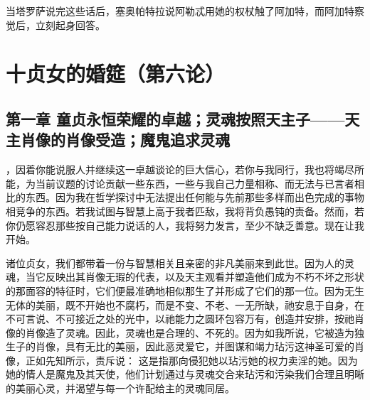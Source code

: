 当塔罗萨说完这些话后，塞奥帕特拉说阿勒忒用她的权杖触了阿加特，而阿加特察觉后，立刻起身回答。\par



\section{十贞女的婚筵（第六论）}

\par


\subsection{第一章 童贞永恒荣耀的卓越；灵魂按照天主子——天主肖像的肖像受造；魔鬼追求灵魂}

，因着你能说服人并继续这一卓越谈论的巨大信心，若你与我同行，我也将竭尽所能，为当前议题的讨论贡献一些东西，一些与我自己力量相称、而无法与已言者相比的东西。因为我在哲学探讨中无法提出任何能与先前那些多样而出色完成的事物相竞争的东西。若我试图与智慧上高于我者匹敌，我将背负愚钝的责备。然而，若你仍愿容忍那些按自己能力说话的人，我将努力发言，至少不缺乏善意。现在让我开始。\par

诸位贞女，我们都带着一份与智慧相关且亲密的非凡美丽来到此世。因为人的灵魂，当它反映出其肖像无瑕的代表，以及天主观看并塑造他们成为不朽不坏之形状的那面容的特征时，它们便最准确地相似那生了并形成了它们的那一位。因为无生无体的美丽，既不开始也不腐朽，而是不变、不老、一无所缺，祂安息于自身，在不可言说、不可接近之处的光中，以祂能力之圆环包容万有，创造并安排，按祂肖像的肖像造了灵魂。因此，灵魂也是合理的、不死的。因为如我所说，它被造为独生子的肖像，具有无比的美丽，因此恶灵爱它，并图谋和竭力玷污这神圣可爱的肖像，正如先知所示，责斥说： 这是指那向侵犯她以玷污她的权力卖淫的她。因为她的情人是魔鬼及其天使，他们计划通过与灵魂交合来玷污和污染我们合理且明晰的美丽心灵，并渴望与每一个许配给主的灵魂同居。\par

